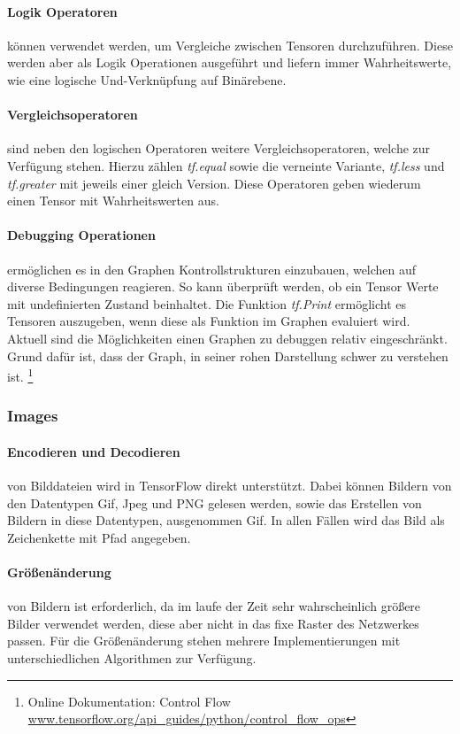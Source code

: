 \paragraph{Logik Operatoren} können verwendet werden, um Vergleiche zwischen Tensoren durchzuführen. 
Diese werden aber als Logik Operationen ausgeführt und liefern immer Wahrheitswerte, wie eine logische Und-Verknüpfung auf Binärebene.

\paragraph{Vergleichsoperatoren} sind neben den logischen Operatoren weitere Vergleichsoperatoren, welche zur Verfügung stehen. 
Hierzu zählen \textit{tf.equal} sowie die verneinte Variante, \textit{tf.less} und \textit{tf.greater} mit jeweils einer gleich Version. 
Diese Operatoren geben wiederum einen Tensor mit Wahrheitswerten aus.

\paragraph{Debugging Operationen} ermöglichen es in den Graphen Kontrollstrukturen einzubauen, welchen auf diverse Bedingungen reagieren.
So kann überprüft werden, ob ein Tensor Werte mit undefinierten Zustand beinhaltet. 
Die Funktion \textit{tf.Print} ermöglicht es Tensoren auszugeben, wenn diese als Funktion im Graphen evaluiert wird. 
Aktuell sind die Möglichkeiten einen Graphen zu debuggen relativ eingeschränkt. 
Grund dafür ist, dass der Graph, in seiner rohen Darstellung schwer zu verstehen ist. \footnote{Online Dokumentation: Control Flow \url{www.tensorflow.org/api_guides/python/control_flow_ops}}

\subsubsection{Images}

\paragraph{Encodieren und Decodieren} von Bilddateien wird in TensorFlow direkt unterstützt.
Dabei können Bildern von den Datentypen Gif, Jpeg und PNG gelesen werden, sowie das Erstellen von Bildern in diese Datentypen, ausgenommen Gif.
In allen Fällen wird das Bild als Zeichenkette mit Pfad angegeben. 

\paragraph{Größenänderung} von Bildern ist erforderlich, da im laufe der Zeit sehr wahrscheinlich größere Bilder verwendet werden, diese aber nicht in das fixe Raster des Netzwerkes passen. 
Für die Größenänderung stehen mehrere Implementierungen mit unterschiedlichen Algorithmen zur Verfügung.

